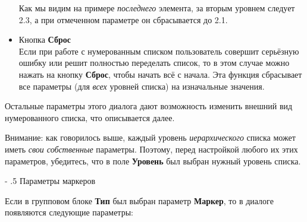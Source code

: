 ﻿\documentclass[a4paper,10pt]{article}
\makeatletter
\renewcommand\paragraph{%
   \@startsection{paragraph}{4}{0mm}%
      {-\baselineskip}%
      {.5\baselineskip}%
      {\normalfont\normalsize\bfseries}}
\makeatother
\begin{document}
\begin{itemize}
 Как мы видим на примере \textit{последнего} элемента, за вторым уровнем следует 2.3, а при отмеченном параметре он сбрасывается до 2.1.
 \item Кнопка \textbf{Сброс}\\
 Если при работе с нумерованным списком пользователь совершит серьёзную ошибку или решит полностью переделать список, то в этом случае можно нажать на кнопку \textbf{Сброс}, чтобы начать всё с начала. Эта функция сбрасывает все параметры (для \textit{всех} уровней списка) на изначальные значения.
\end{itemize}

Остальные параметры этого диалога дают возможность изменить внешний вид нумерованного списка, что описывается далее.

Внимание: как говорилось выше, каждый уровень \textit{иерархического} списка может иметь \textit{свои собственные} параметры. Поэтому, перед настройкой любого их этих параметров, убедитесь, что в поле \textbf{Уровень} был выбран нужный уровень списка.

\paragraph{Параметры маркеров}

Если в групповом блоке \textbf{Тип} был выбран параметр \textbf{Маркер}, то в диалоге появляются следующие параметры:
\end{document}
